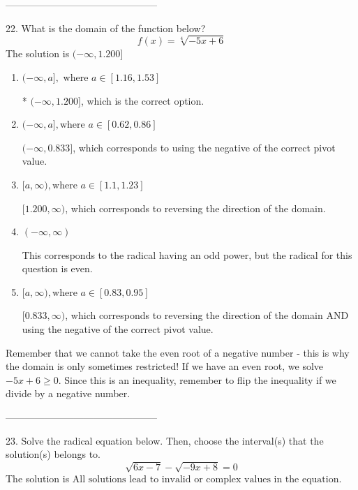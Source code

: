 \documentclass{article}[14pt]
\begin{document}
-----------------------------------------------

22. What is the domain of the function below?
$$ f(x) = \sqrt[4]{-5 x + 6} $$ 
The solution is $ (-\infty, 1.200] $ 

\begin{enumerate}[label=\Alph*.] 
\item $ (-\infty, a], \text{ where } a \in [1.16, 1.53] $ 

 * $(-\infty, 1.200]$, which is the correct option. 
\item $ (-\infty, a], \text{where } a \in [0.62, 0.86] $ 

 $(-\infty, 0.833]$, which corresponds to using the negative of the correct pivot value. 
\item $ [a, \infty), \text{where } a \in [1.1, 1.23] $ 

  $[1.200, \infty)$, which corresponds to reversing the direction of the domain. 
\item $ (-\infty, \infty) $ 

 This corresponds to the radical having an odd power, but the radical for this question is even. 
\item $ [a, \infty), \text{where } a \in [0.83, 0.95] $ 

 $[0.833, \infty)$, which corresponds to reversing the direction of the domain AND using the negative of the correct pivot value. 
\end{enumerate} 
 
Remember that we cannot take the even root of a negative number - this is why the domain is only sometimes restricted! If we have an even root, we solve $-5 x + 6 \geq 0$. Since this is an inequality, remember to flip the inequality if we divide by a negative number.

-----------------------------------------------

23. Solve the radical equation below. Then, choose the interval(s) that the solution(s) belongs to.
$$ \sqrt{6 x - 7} - \sqrt{-9 x + 8} = 0 $$ 
The solution is $ \text{All solutions lead to invalid or complex values in the equation.} $ 
\end{document}
